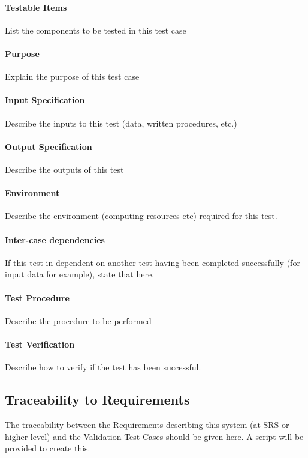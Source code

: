 \paragraph{Testable Items}

List the components to be tested in this test case






\paragraph{Purpose}

Explain the purpose of this test case

\paragraph{Input Specification}

Describe the inputs to this test (data, written procedures, etc.)

\paragraph{Output Specification}

Describe the outputs of this test

\paragraph{Environment}

Describe the environment (computing resources etc) required for this test.

\paragraph{Inter-case dependencies}

If this test in dependent on another test having been completed successfully (for input data for example), state that here.

\paragraph{Test Procedure}

Describe the procedure to be performed

\paragraph{Test Verification}

Describe how to verify if the test has been successful.

\subsection{Traceability to Requirements}

The traceability between the Requirements describing this system (at SRS or higher level) and the Validation Test Cases should be given here. A script will be provided to create this.


